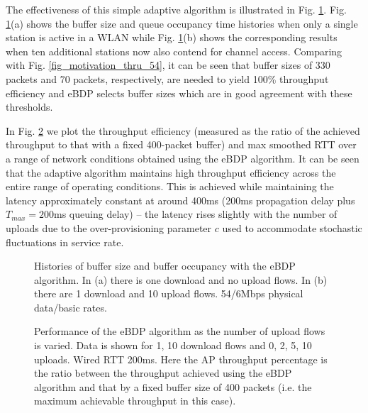 \documentclass[10pt,twocolumn, journal]{IEEEtran}
\begin{document}
The effectiveness of this simple adaptive algorithm is illustrated in Fig.
\ref{fig_eBDP_histories}.  Fig. \ref{fig_eBDP_histories}(a) shows the buffer size and queue occupancy time histories when only a single station is active in a WLAN while Fig. \ref{fig_eBDP_histories}(b) shows the corresponding results when ten additional stations now also contend for channel access.    Comparing with Fig. \ref{fig_motivation_thru_54}, it can be seen that buffer sizes of 330 packets and 70 packets, respectively, are needed to yield 100\% throughput efficiency and eBDP selects buffer sizes which are in good agreement with these thresholds.

In Fig. \ref{fig_eBDP_varyuls} we plot the throughput efficiency (measured as the ratio of the achieved throughput to that with a fixed 400-packet buffer) and max smoothed RTT over a range of network conditions obtained using the eBDP algorithm.  It can be seen that the adaptive algorithm maintains high throughput efficiency across the entire range of operating conditions. This is achieved while maintaining the latency approximately constant at around 400ms (200ms propagation delay plus $T_{max}=200$ms queuing delay) -- the latency rises slightly with the number of uploads due to the over-provisioning parameter $c$ used to accommodate
stochastic fluctuations in service rate.

\begin{figure}[tb]
   \centering
   \caption{Histories of buffer size and buffer occupancy with the eBDP algorithm.
   In (a) there is one download and no upload flows. In (b) there are 1 download and 10 upload flows. 54/6Mbps physical data/basic rates. }
   \label{fig_eBDP_histories}
\end{figure}


\begin{figure}[tb]
   \centering
   \caption{Performance of the eBDP algorithm as the number of upload
    flows is varied. Data is shown for 1, 10 download flows
   and 0, 2, 5, 10 uploads.  Wired RTT 200ms.  Here the AP throughput percentage is the ratio between the throughput achieved using the eBDP algorithm and that by a fixed buffer size of 400 packets (i.e. the maximum achievable throughput in this case). }
   \label{fig_eBDP_varyuls}
\end{figure}
\end{document}
